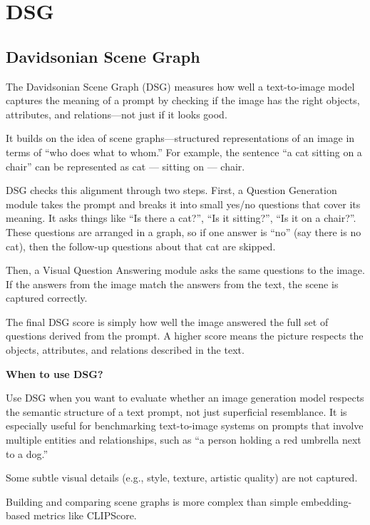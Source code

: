 \clearpage
\thispagestyle{genaistyle}
\section{DSG}
\subsection{Davidsonian Scene Graph}


The Davidsonian Scene Graph (DSG) measures how well a text-to-image model captures the meaning of a prompt by checking if the image has the right 
objects, attributes, and relations—not just if it looks good.

It builds on the idea of scene graphs—structured representations of an image in terms of “who does what to whom.” For example, the sentence
“a cat sitting on a chair” can be represented as cat — sitting on — chair.

DSG checks this alignment through two steps. First, a Question Generation module takes the prompt and breaks it into small yes/no questions
that cover its meaning. It asks things like “Is there a cat?”, “Is it sitting?”, “Is it on a chair?”. These questions are arranged in a graph,
so if one answer is “no” (say there is no cat), then the follow-up questions about that cat are skipped.

Then, a Visual Question Answering module asks the same questions to the image. If the answers from the image match the answers from the text,
the scene is captured correctly.

The final DSG score is simply how well the image answered the full set of questions derived from the prompt. A higher score means the picture
respects the objects, attributes, and relations described in the text.


\textbf{When to use DSG?}

Use DSG when you want to evaluate whether an image generation model respects the semantic structure of a text prompt, not just
superficial resemblance. It is especially useful for benchmarking text-to-image systems on prompts that involve multiple entities and
relationships, such as “a person holding a red umbrella next to a dog.”

{
\item Some subtle visual details (e.g., style, texture, artistic quality) are not captured.
\item Building and comparing scene graphs is more complex than simple embedding-based metrics like CLIPScore.
}


